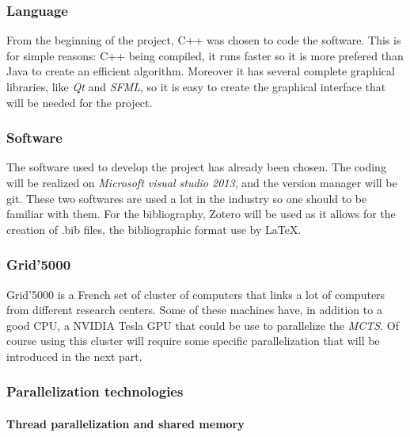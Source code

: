 \label{last part}
\subsubsection{Language}

From the beginning of the project, C++ was chosen to code the software. This is for simple reasons: C++ being compiled, it runs faster so it is more prefered than Java to create an efficient algorithm.  Moreover it has several complete graphical libraries, like \emph{Qt} and \emph{SFML}, so it is easy to create the graphical interface that will be needed for the project.

\subsubsection{Software}

The software used to develop the project has already been chosen. The coding will be realized on \emph{Microsoft visual studio 2013}, and the version manager will be git. These two softwares are used a lot in the industry so one should to be familiar with them.
For the bibliography, Zotero will be used as it allows for the creation of .bib files, the bibliographic format use by LaTeX.

\subsubsection{Grid'5000}

Grid'5000 is a French set of cluster of computers that links a lot of computers from different research centers. Some of these machines have, in addition to a good CPU, a NVIDIA Tesla GPU that could be use to parallelize the \emph{MCTS}. Of course using this cluster will require some specific parallelization that will be introduced in the next part.

\subsubsection{Parallelization technologies}

\paragraph{Thread parallelization and shared memory}\mbox{}\\\mbox{}\\


